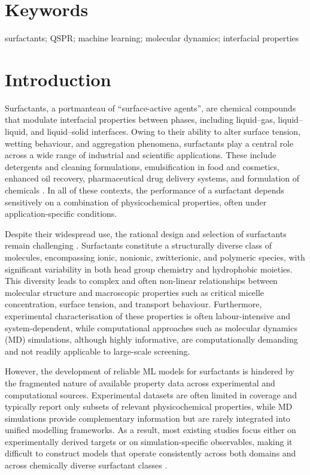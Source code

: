 \documentclass[letterpaper]{article}
\begin{document}
\section*{Keywords}
surfactants; QSPR; machine learning; molecular dynamics; interfacial properties


\section{Introduction}
\label{sec:introduction}

Surfactants, a portmanteau of ``surface-active agents'', are chemical compounds that modulate interfacial properties between phases, including liquid–gas, liquid–liquid, and liquid–solid interfaces\cite{jia_review_2024}. Owing to their ability to alter surface tension, wetting behaviour, and aggregation phenomena, surfactants play a central role across a wide range of industrial and scientific applications. These include detergents and cleaning formulations, emulsification in food and cosmetics, enhanced oil recovery, pharmaceutical drug delivery systems, and formulation of chemicals \cite{sharma_safer_2023,chen_emerging_2024}. In all of these contexts, the performance of a surfactant depends sensitively on a combination of physicochemical properties, often under application-specific conditions.

Despite their widespread use, the rational design and selection of surfactants remain challenging \cite{katritzky_qspr_2007,hu_review_2010}. Surfactants constitute a structurally diverse class of molecules, encompassing ionic, nonionic, zwitterionic, and polymeric species, with significant variability in both head group chemistry and hydrophobic moieties. This diversity leads to complex and often non-linear relationships between molecular structure and macroscopic properties such as critical micelle concentration, surface tension, and transport behaviour\cite{bera_counteracting_2018,kovalchuk_surfactant-mediated_2021}. Furthermore, experimental characterisation of these properties is often labour-intensive and system-dependent, while computational approaches such as molecular dynamics (MD) simulations, although highly informative, are computationally demanding and not readily applicable to large-scale screening\cite{qazi_dynamic_2020,chen_molecular_2025}.

However, the development of reliable ML models for surfactants is hindered by the fragmented nature of available property data across experimental and computational sources. Experimental datasets are often limited in coverage and typically report only subsets of relevant physicochemical properties, while MD simulations provide complementary information but are rarely integrated into unified modelling frameworks. As a result, most existing studies focus either on experimentally derived targets or on simulation-specific observables, making it difficult to construct models that operate consistently across both domains and across chemically diverse surfactant classes \cite{thacker_can_2023,brozos_graph_2024,nnadili_surfactant-specific_2024,hodl_surfpro_2025}.
\end{document}
